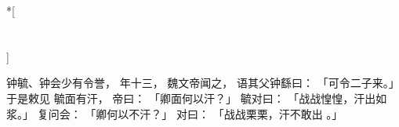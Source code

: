 
\switchcolumn[0]*[\section{}]

钟毓、钟会少有令誉，
年十三，
魏文帝闻之，
语其父钟繇曰：
「可令二子来。」
于是敕见
毓面有汗，
帝曰：
「卿面何以汗？」
毓对曰：
「战战惶惶，汗出如浆。」
复问会：
「卿何以不汗？」
对曰：
「战战栗栗，汗不敢出 。」

\switchcolumn



